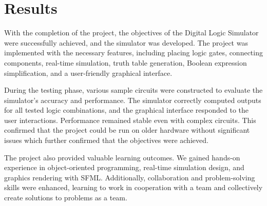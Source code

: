 \section{Results}

With the completion of the project, the objectives of the Digital Logic Simulator were successfully achieved, and the simulator was developed. The project was implemented with the necessary features, including placing logic gates, connecting components, real-time simulation, truth table generation, Boolean expression simplification, and a user-friendly graphical interface.

\vspace{0.5cm}
During the testing phase, various sample circuits were constructed to evaluate the simulator's accuracy and performance. The simulator correctly computed outputs for all tested logic combinations, and the graphical interface responded to the user interactions. Performance remained stable even with complex circuits. This confirmed that the project could be run on older hardware without significant issues which further confirmed that the objectives were achieved.

\vspace{0.5cm}
The project also provided valuable learning outcomes. We gained hands-on experience in object-oriented programming, real-time simulation design, and graphics rendering with SFML. Additionally, collaboration and problem-solving skills were enhanced, learning to work in cooperation with a team and collectively create solutions to problems as a team.
\clearpage